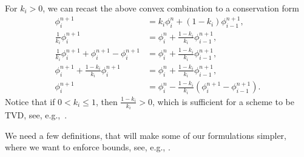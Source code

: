 \documentclass[../thesis.tex]{subfiles}
\begin{document}
For \(k_{i} > 0\), we can recast the above convex combination to a conservation form
\begin{equation}\label{eqn:convex-combination-conservative}
    \begin{split}
        \phi_{i}^{n+1}
        &=
        k_{i}\phi_{i}^{n} + (1-k_{i})\phi_{i-1}^{n+1},
        \\
        \frac{1}{k_{i}}\phi_{i}^{n+1}
        &=
        \phi_{i}^{n} + \frac{1-k_{i}}{k_{i}}\phi_{i-1}^{n+1},
        \\
        \frac{1}{k_{i}}\phi_{i}^{n+1} + \phi_{i}^{n+1} - \phi_{i}^{n+1}
        &=
        \phi_{i}^{n} + \frac{1-k_{i}}{k_{i}}\phi_{i-1}^{n+1},
        \\
        \phi_{i}^{n+1} + \frac{1-k_{i}}{k_{i}}\phi_{i}^{n+1}
        &=
        \phi_{i}^{n} + \frac{1-k_{i}}{k_{i}}\phi_{i-1}^{n+1},
        \\
        \phi_{i}^{n+1}
        &=
        \phi_{i}^{n} - \frac{1-k_{i}}{k_{i}}\left( \phi_{i}^{n+1} - \phi_{i-1}^{n+1} \right).
    \end{split}
\end{equation}
Notice that if \(0 < k_{i} \leq 1\), then \( \frac{1-k_{i}}{k_{i}} > 0\), which is sufficient for a scheme to be TVD, see, e.g.,~\cite{2007_Duraisamy,2023_Frolkovic}.

We need a few definitions, that will make some of our formulations simpler, where we want to enforce bounds, see, e.g., \cite{1989_Huynh_CONF,1993_Huynh}.
\end{document}
